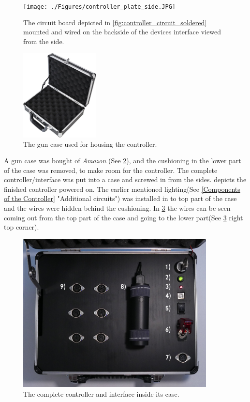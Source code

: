 \begin{figure}[!ht]
    \centering
    \texttt{[image: ./Figures/controller\_plate\_side.JPG]}
    \caption{The circuit board depicted in \cref{fig:controller_circuit_soldered} mounted and wired on the backside of the devices interface viewed from the side. }
    \label{fig:controller_plate_side}     
\end{figure}

\pagebreak

\begin{figure}[!ht]
    \centering
    \includegraphics[width=4cm]{./Figures/gn_case.jpg}
    \caption{ The gun case used for housing the controller. }
    \label{fig:gn_case}     
\end{figure}


\noindent A gun case was bought of \textit{Amazon} (See \cref{fig:gn_case}), and the cushioning in the lower part of the case was removed, to make room for the controller. The complete controller/interface was put into a case and screwed in from the sides.  depicts the finished controller powered on. The earlier mentioned lighting(See \cref{Components of the Controller} "Additional circuits") was installed in to top part of the case and the wires were hidden behind the cushioning. In \cref{fig:controller_open} the wires can be seen coming out from the top part of the case and going to the lower part(See \cref{fig:controller_open} right top corner).


\begin{figure}[!ht]
    \centering
    \includegraphics[width=10cm]{./Figures/controller_open_legend.png}
    \caption{ The complete controller and interface inside its case. }
    \label{fig:controller_open}     
\end{figure}

